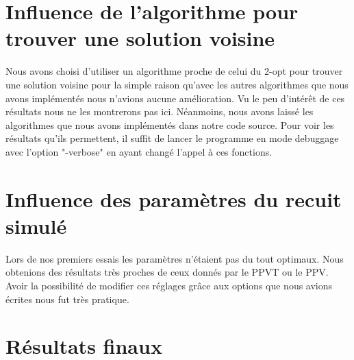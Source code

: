 \documentclass{article}
\begin{document}
\section{Influence de l'algorithme pour trouver une solution voisine}
 
Nous avons choisi d'utiliser un algorithme proche de celui du 2-opt pour trouver une solution voisine pour la simple raison qu'avec les autres algorithmes que nous avons implémentés nous n'avions aucune amélioration.
Vu le peu d'intérêt de ces résultats nous ne les montrerons pas ici.
Néanmoins, nous avons laissé les algorithmes que nous avons implémentés dans notre code source.
Pour voir les résultats qu'ils permettent, il suffit de lancer le programme en mode debuggage avec l'option "-verbose" en ayant changé l'appel à ces fonctions.
 
\section{Influence des paramètres du recuit simulé}
 
Lors de nos premiers essais les paramètres n'étaient pas du tout optimaux.
Nous obtenions des résultats très proches de ceux donnés par le PPVT ou le PPV.
Avoir la possibilité de modifier ces réglages grâce aux options que nous avions écrites nous fut très pratique.

\clearpage
\section{Résultats finaux}
 
\end{document}
